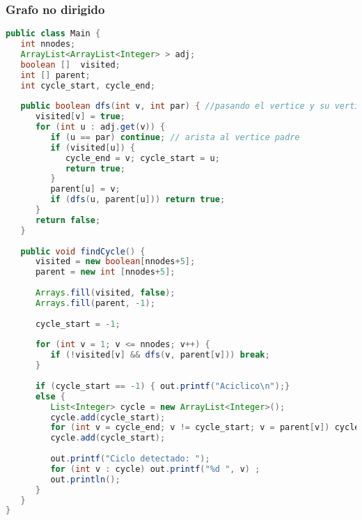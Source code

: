 \subsubsection{Grafo no dirigido}
\begin{lstlisting}[language=Java]
public class Main {
   int nnodes;
   ArrayList<ArrayList<Integer> > adj;
   boolean []  visited;
   int [] parent;
   int cycle_start, cycle_end;
	
   public boolean dfs(int v, int par) { //pasando el vertice y su vertice padre
      visited[v] = true;
      for (int u : adj.get(v)) {
         if (u == par) continue; // arista al vertice padre
         if (visited[u]) {
            cycle_end = v; cycle_start = u;
            return true;
         }
         parent[u] = v;
         if (dfs(u, parent[u])) return true;
      }
      return false;
   }
	
   public void findCycle() {
      visited = new boolean[nnodes+5];
      parent = new int [nnodes+5];
      
      Arrays.fill(visited, false);
      Arrays.fill(parent, -1);
		
      cycle_start = -1;
		
      for (int v = 1; v <= nnodes; v++) {
         if (!visited[v] && dfs(v, parent[v])) break;
      }
		
      if (cycle_start == -1) { out.printf("Aciclico\n");} 
      else {
         List<Integer> cycle = new ArrayList<Integer>();
         cycle.add(cycle_start);
         for (int v = cycle_end; v != cycle_start; v = parent[v]) cycle.add(v);
         cycle.add(cycle_start);
			
         out.printf("Ciclo detectado: ");
         for (int v : cycle) out.printf("%d ", v) ;
         out.println();
      }
   }
}
\end{lstlisting}